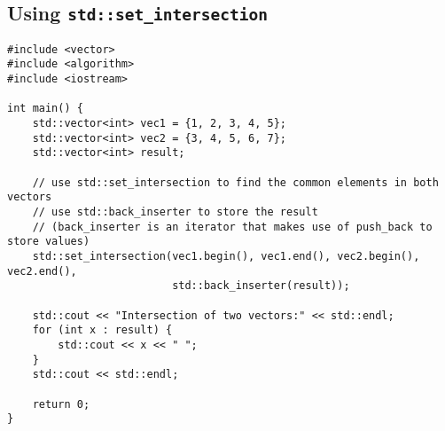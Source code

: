 \documentclass{article}
\begin{document}
\subsection*{Using \texttt{std::set\_intersection}}
\begin{verbatim}
#include <vector>
#include <algorithm>
#include <iostream>

int main() {
    std::vector<int> vec1 = {1, 2, 3, 4, 5};
    std::vector<int> vec2 = {3, 4, 5, 6, 7};
    std::vector<int> result;
	
    // use std::set_intersection to find the common elements in both vectors
    // use std::back_inserter to store the result
    // (back_inserter is an iterator that makes use of push_back to store values)
    std::set_intersection(vec1.begin(), vec1.end(), vec2.begin(), vec2.end(),
                          std::back_inserter(result));

    std::cout << "Intersection of two vectors:" << std::endl;
    for (int x : result) {
        std::cout << x << " ";
    }
    std::cout << std::endl;

    return 0;
}
\end{verbatim}
\end{document}
